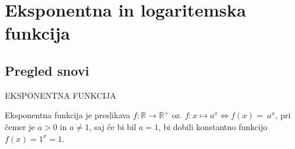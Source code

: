 \chapter{Eksponentna in logaritemska funkcija}
\label{cha:exp-log}

\section{Pregled snovi}
\label{sec:exp-log-pregled-snovi}


\begin{center}
EKSPONENTNA FUNKCIJA
\end{center}

Eksponentna funkcija je preslikava $f: \mathbb{R} \longrightarrow \mathbb{R}^+$ oz. $f: x \longmapsto a^x \Leftrightarrow f(x) =~a^x$, pri čemer je $a > 0$ in $a \neq 1$, saj če bi bil $a=1$, bi dobili konstantno funkcijo	$f(x) = 1^x = 1$.
\\

